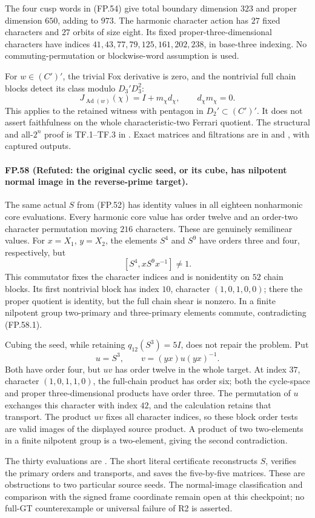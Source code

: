 The four cusp words in (FP.54) give total boundary dimension
$323$ and proper dimension $650$, adding to $973$.
The harmonic character action has $27$ fixed characters and
$27$ orbits of size eight. Its fixed proper-three-dimensional
characters have indices $41,43,77,79,125,161,202,238$, in
base-three indexing. No commuting-permutation or blockwise-word
assumption is used.

For $w\in(C')'$, the trivial Fox derivative is zero, and the
nontrivial full chain blocks detect its class modulo $D_3'D_3^2$:
\[
 J_{\operatorname{Ad}(w)}(\chi)=I+m_\chi d_\chi,
 \qquad d_\chi m_\chi=0.
\]
This applies to the retained witness with pentagon in
$D_2'\subset(C')'$. It does not assert faithfulness on the
whole characteristic-two Ferrari quotient. The structural
and all-$2^n$ proof is TF.1--TF.3 in
.
Exact matrices and filtrations are in
 and ,
with captured outputs.

\paragraph{FP.58 (Refuted: the original cyclic seed, or its cube, has nilpotent normal image in the reverse-prime target).}
The same actual $S$ from (FP.52) has identity values in all
eighteen nonharmonic core evaluations. Every harmonic core
value has order twelve and an order-two character permutation
moving $216$ characters. These are genuinely semilinear values.
For $x=X_1$, $y=X_2$, the elements $S^4$ and $S^9$ have
orders three and four, respectively, but
\[
                     [S^4,xS^9x^{-1}]\ne1.
 \tag{FP.58.1}
\]
This commutator fixes the character indices and is nonidentity
on $52$ chain blocks. Its first nontrivial block has index $10$,
character $(1,0,1,0,0)$; there the proper quotient is identity,
but the full chain shear is nonzero. In a finite nilpotent group
two-primary and three-primary elements commute, contradicting
(FP.58.1).

Cubing the seed, while retaining $q_{12}(S^3)=5I$, does not
repair the problem. Put
\[
                  u=S^3,\qquad v=(yx)u(yx)^{-1}.
 \tag{FP.58.2}
\]
Both have order four, but $uv$ has order twelve in the whole
target. At index $37$, character $(1,0,1,1,0)$, the full-chain
product has order six; both the cycle-space and proper
three-dimensional products have order three. The permutation
of $u$ exchanges this character with index $42$, and the
calculation retains that transport. The product $uv$ fixes all
character indices, so these block order tests are valid images
of the displayed source product. A product of two two-elements
in a finite nilpotent group is a two-element, giving the second
contradiction.

The thirty evaluations are .
The short literal certificate 
reconstructs $S$, verifies the primary orders and transports,
and saves the five-by-five matrices. These are obstructions to
two particular source seeds. The normal-image classification
and comparison with the signed frame coordinate remain open
at this checkpoint; no full-GT counterexample or universal
failure of R2 is asserted.
